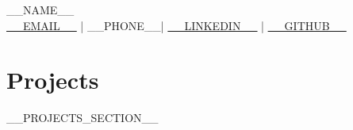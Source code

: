 \documentclass[a4paper,10pt]{article}
\newcommand{\myname}{__NAME__}
\newcommand{\myemail}{__EMAIL__}
\newcommand{\myphone}{__PHONE__}
\newcommand{\mylinkedin}{__LINKEDIN__}
\newcommand{\mygithub}{__GITHUB__}
\begin{document}
\begin{center}
    {\Huge \myname} \\ \vspace{2mm}
    \href{mailto:\myemail}{\myemail} | \myphone | \href{https://\mylinkedin}{\mylinkedin} | \href{https://\mygithub}{\mygithub}
\end{center}

\section*{Projects}
__PROJECTS_SECTION__
\end{document}
